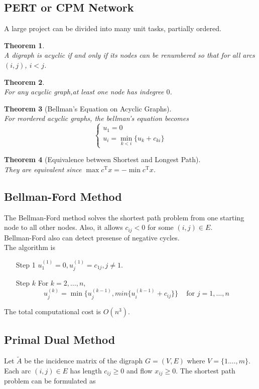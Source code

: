 \documentclass[12pt]{article}
\newcommand{\T}{\mathrm{T}}
\newtheorem{theorem}{Theorem}[section]
\theoremstyle{definition}
\begin{document}
\subsection{PERT or CPM Network}
A large project can be divided into many unit tasks, partially ordered.
\begin{theorem}
\hfill\\\normalfont A digraph is acyclic if and only if its nodes can be renumbered so that for all arcs $(i,j)$, $i<j$.
\end{theorem}
\begin{theorem}
\hfill\\\normalfont For any acyclic graph,at least one node has indegree $0$.
\end{theorem}
\begin{theorem}[Bellman's Equation on Acyclic Graphs]
\hfill\\\normalfont For reordered acyclic graphs, the bellman's equation becomes 
\[
\begin{cases}
u_1=0\\
u_i=\min_{k<i}\{u_k+c_{ki}\}
\end{cases}
\]
\end{theorem}
\begin{theorem}[Equivalence between Shortest and Longest Path]
\hfill\\\normalfont They are equivalent since $\max c^\T x=-\min c^\T x$.
\end{theorem}
\subsection{Bellman-Ford Method}
The Bellman-Ford method solves the shortest path problem from one starting node to all other nodes. Also, it allows $c_{ij}<0$ for some $(i,j)\in E$. \\
Bellman-Ford also can detect presense of negative cycles.\\

The algorithm is 
\begin{itemize}
  \item[Step 1] $u_1^{(1)} = 0, u_j^{(1)}=c_{1j}, j\neq 1$.
  \item[Step {$k$}] For $k=2,\ldots, n$,
  \[
u_j^{(k)} = \min\{u_j^{(k-1)}, min\{u_i^{(k-1)}+c_{ij}\}\}\;\;\;\text{ for } j=1,\ldots, n
  \]
\end{itemize}
The total computational cost is $O(n^3)$.
\subsection{Primal Dual Method}
Let $\tilde{A}$ be the incidence matrix of the digraph $G=(V,E)$ where $V=\{1.\ldots, m\}$.\\
Each arc $(i,j)\in E$ has length $c_{ij}\geq 0$ and flow $x_{ij}\geq 0$. The shortest path problem can be formulated as
\end{document}
